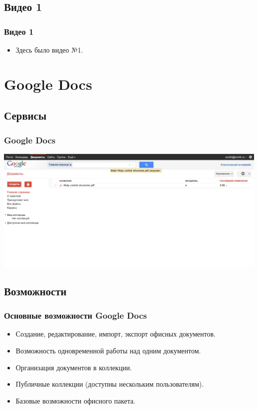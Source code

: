 \documentclass[compress,red]{beamer}
\begin{document}
\subsection{Видео 1}
\begin{frame}[fragile]
  \frametitle{Видео 1}
  \begin{itemize}
    \item Здесь было видео №1.
  \end{itemize}
\end{frame}

\section{Google Docs}
\subsection{Сервисы}
\begin{frame}
  \frametitle{Google Docs}
	\centerline{\includegraphics[width=1.0\textwidth]{images/gdocs1.jpg}}
\end{frame}

\subsection{Возможности}
\begin{frame}[fragile]
  \frametitle{Основные возможности Google Docs}
	\begin{itemize}
  	\item Создание, редактирование, импорт, экспорт офисных документов.
  	\item Возможность одновременной работы над одним документом.
  	\item Организация документов в коллекции.
  	\item Публичные коллекции (доступны нескольким пользователям).
  	\item Базовые возможности офисного пакета.
	\end{itemize}
\end{frame}
\end{document}
